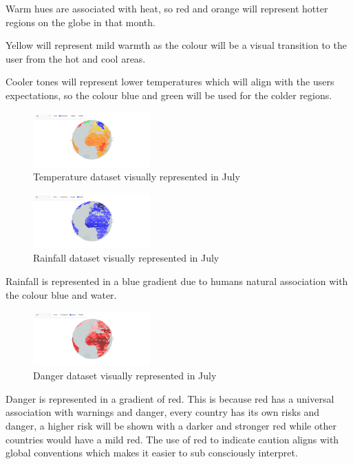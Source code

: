 \documentclass[]{project_final}
\begin{document}
Warm hues are associated with heat, so red and orange will represent hotter regions on the globe in that month.

Yellow will represent mild warmth as the colour will be a visual transition to the user from the hot and cool areas.

Cooler tones will represent lower temperatures which will align with the users expectations, so the colour blue and green will be used for the colder regions.

\begin{figure}[ht!]
    \centering
    \includegraphics[width=0.4\textwidth]{4.png}
    \caption{Temperature dataset visually represented in July}
    \label{fig:1}
\end{figure}

\begin{figure}[ht!]
    \centering
    \includegraphics[width=0.4\textwidth]{5.png}
    \caption{Rainfall dataset visually represented in July}
    \label{fig:1}
\end{figure}
Rainfall is represented in a blue gradient due to humans natural association with the colour blue and water.


\begin{figure}[ht!]
    \centering
    \includegraphics[width=0.4\textwidth]{6.png}
    \caption{Danger dataset visually represented in July}
    \label{fig:1}
\end{figure}
Danger is represented in a gradient of red. This is because red has a universal association with warnings and danger, every country has its own risks and danger, a higher risk will be shown with a darker and stronger red while other countries would have a mild red. The use of red to indicate caution aligns with global conventions which makes it easier to sub consciously interpret.
\end{document}
